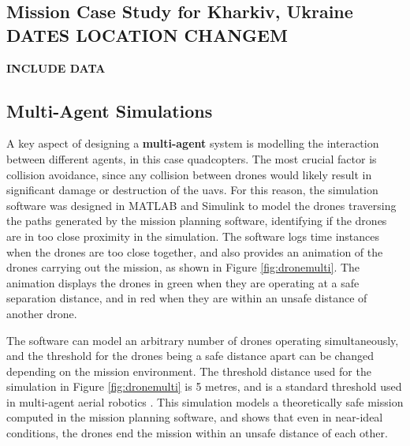 \newpage

\subsection{Mission Case Study for Kharkiv, Ukraine DATES LOCATION CHANGEM}

\textbf{INCLUDE DATA}
\newpage
\subsection{Multi-Agent Simulations}

A key aspect of designing a \textbf{multi-agent} system is modelling the interaction between different agents, in this case quadcopters. The most crucial factor is collision avoidance, since any collision between drones would likely result in significant damage or destruction of the \gls{uav}s. For this reason, the simulation software was designed in MATLAB and Simulink to model the drones traversing the paths generated by the mission planning software, identifying if the drones are in too close proximity in the simulation. The software logs time instances when the drones are too close together, and also provides an animation of the drones carrying out the mission, as shown in Figure \ref{fig:dronemulti}. The animation displays the drones in green when they are operating at a safe separation distance, and in red when they are within an unsafe distance of another drone. 

The software can model an arbitrary number of drones operating simultaneously, and the threshold for the drones being a safe distance apart can be changed depending on the mission environment. The threshold distance used for the simulation in Figure \ref{fig:dronemulti} is 5 metres, and is a standard threshold used in multi-agent aerial robotics \cite{crannverdon}. This simulation models a theoretically safe mission computed in the mission planning software, and shows that even in near-ideal conditions, the drones end the mission within an unsafe distance of each other. 
 

